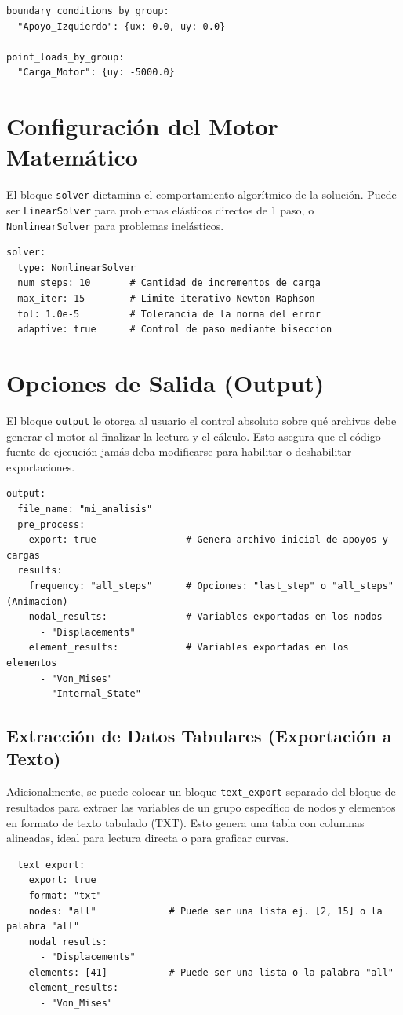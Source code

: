 \documentclass[12pt,a4paper]{article}
\begin{document}
\begin{lstlisting}
boundary_conditions_by_group:
  "Apoyo_Izquierdo": {ux: 0.0, uy: 0.0}

point_loads_by_group:
  "Carga_Motor": {uy: -5000.0}
\end{lstlisting}

\section{Configuración del Motor Matemático}
El bloque \texttt{solver} dictamina el comportamiento algorítmico de la solución. Puede ser \texttt{LinearSolver} para problemas elásticos directos de 1 paso, o \texttt{NonlinearSolver} para problemas inelásticos.
\begin{lstlisting}
solver:
  type: NonlinearSolver
  num_steps: 10       # Cantidad de incrementos de carga
  max_iter: 15        # Limite iterativo Newton-Raphson
  tol: 1.0e-5         # Tolerancia de la norma del error
  adaptive: true      # Control de paso mediante biseccion
\end{lstlisting}

\section{Opciones de Salida (Output)}
El bloque \texttt{output} le otorga al usuario el control absoluto sobre qué archivos debe generar el motor al finalizar la lectura y el cálculo. Esto asegura que el código fuente de ejecución jamás deba modificarse para habilitar o deshabilitar exportaciones.
\begin{lstlisting}
output:
  file_name: "mi_analisis"
  pre_process:
    export: true                # Genera archivo inicial de apoyos y cargas
  results:
    frequency: "all_steps"      # Opciones: "last_step" o "all_steps" (Animacion)
    nodal_results:              # Variables exportadas en los nodos
      - "Displacements"
    element_results:            # Variables exportadas en los elementos
      - "Von_Mises"
      - "Internal_State"
\end{lstlisting}

\subsection{Extracción de Datos Tabulares (Exportación a Texto)}
Adicionalmente, se puede colocar un bloque \texttt{text\_export} separado del bloque de resultados para extraer las variables de un grupo específico de nodos y elementos en formato de texto tabulado (TXT). Esto genera una tabla con columnas alineadas, ideal para lectura directa o para graficar curvas.
\begin{lstlisting}
  text_export:
    export: true
    format: "txt"
    nodes: "all"             # Puede ser una lista ej. [2, 15] o la palabra "all"
    nodal_results:
      - "Displacements"
    elements: [41]           # Puede ser una lista o la palabra "all"
    element_results:
      - "Von_Mises"
\end{lstlisting}
\end{document}
